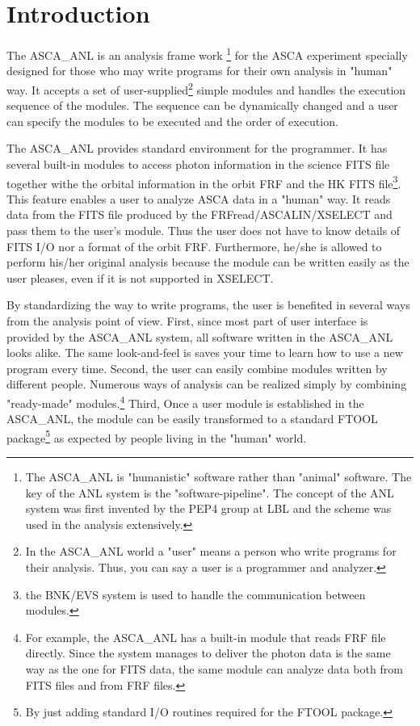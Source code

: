 \chapter{Introduction}
The ASCA\_ANL is an
 analysis frame work
\footnote{The ASCA\_ANL is  "humanistic" software rather than
"animal" software.
The key of the ANL system is the "software-pipeline".
The concept of the ANL system was first invented by the
PEP4 group at LBL and the scheme was used in the
analysis extensively.}
for the ASCA experiment
specially designed for those
who may write programs for their own analysis in "human" way.
It accepts a set of user-supplied\footnote{
In the ASCA\_ANL world a "user" means
a person who write programs for their analysis.
Thus, you can say a user is a programmer and analyzer.
}
simple modules
and handles the execution sequence of the modules.
The sequence can be dynamically changed
and a user can specify the modules to be executed
and the order of execution.


The ASCA\_ANL provides standard environment for the programmer.
It has several built-in modules
 to access
photon information in the science FITS file
together withe the  orbital information in the orbit FRF and
the HK FITS file\footnote{
the BNK/EVS system is used to handle the communication
between modules.
}. This feature enables a user to analyze ASCA data in a "human" way.
It reads data from the FITS file produced by the FRFread/ASCALIN/XSELECT
and pass them to the user's module.
Thus the user does not have to know details of FITS I/O
nor a format of the orbit FRF.
Furthermore,
he/she is allowed to perform his/her original analysis
because the module can be written easily as the user pleases,
even if it is not supported in XSELECT.

By standardizing the way to write programs,
the user is benefited in several ways from the analysis point of view.
First,
since most part of user interface is provided by the ASCA\_ANL system,
all software written in the ASCA\_ANL looks alike.
The same look-and-feel is saves your time
to learn  how to use a new program every time.
Second,
the user can easily  combine modules written by different people.
Numerous ways of analysis can be realized
simply by combining "ready-made" modules.\footnote{
For example,
the ASCA\_ANL has a built-in module that reads FRF file directly.
Since the system manages to deliver the photon data is the same
way as the one for FITS data,
the same module can analyze data both from FITS files and from FRF files.
}
Third,
Once a user module is established in the ASCA\_ANL,
the module can be easily transformed to a standard FTOOL package\footnote{
By just adding standard I/O routines required for the FTOOL package.
}
as expected by people living in the "human" world.


